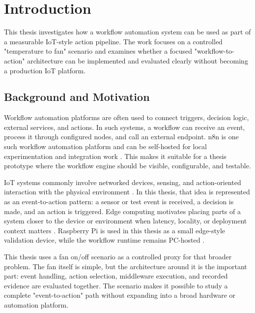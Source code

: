 \section{Introduction}\label{sec:intro}

This thesis investigates how a workflow automation system can be used as part of a measurable IoT-style action pipeline. The work focuses on a controlled "temperature to fan" scenario and examines whether a focused "workflow-to-action" architecture can be implemented and evaluated clearly without becoming a production IoT platform.

\subsection{Background and Motivation}\label{subsec:background}

Workflow automation platforms are often used to connect triggers, decision logic, external services, and actions. In such systems, a workflow can receive an event, process it through configured nodes, and call an external endpoint. n8n is one such workflow automation platform and can be self-hosted for local experimentation and integration work \cite{n8nDocs,workflowPatternsAalst}. This makes it suitable for a thesis prototype where the workflow engine should be visible, configurable, and testable.


IoT systems commonly involve networked devices, sensing, and action-oriented interaction with the physical environment \cite{iotSurveyAtzori}. In this thesis, that idea is represented as an event-to-action pattern: a sensor or test event is received, a decision is made, and an action is triggered. Edge computing motivates placing parts of a system closer to the device or environment when latency, locality, or deployment context matters \cite{edgeComputingSatyanarayanan,edgeIntelligenceZhou2019}. Raspberry Pi is used in this thesis as a small edge-style validation device, while the workflow runtime remains PC-hosted \cite{raspberryPiDocs}.



This thesis uses a fan on/off scenario as a controlled proxy for that broader problem. The fan itself is simple, but the architecture around it is the important part: event handling, action selection, middleware execution, and recorded evidence are evaluated together. The scenario makes it possible to study a complete "event-to-action" path without expanding into a broad hardware or automation platform.

